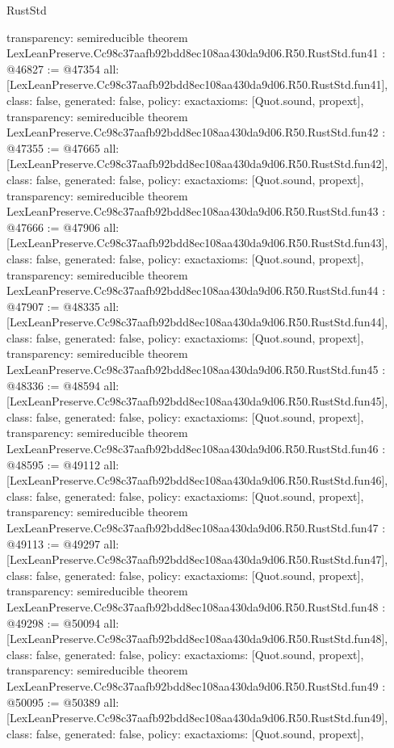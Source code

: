 \begin{lexlean}{RustStd}
\begin{coremodule}
{  transparency: semireducible
}
theorem LexLeanPreserve.Cc98c37aafb92bdd8ec108aa430da9d06.R50.RustStd.fun41 : @46827 := @47354 {
  all: [LexLeanPreserve.Cc98c37aafb92bdd8ec108aa430da9d06.R50.RustStd.fun41],
  class: false,
  generated: false,
  policy: exact{axioms: [Quot.sound, propext]},
  transparency: semireducible
}
theorem LexLeanPreserve.Cc98c37aafb92bdd8ec108aa430da9d06.R50.RustStd.fun42 : @47355 := @47665 {
  all: [LexLeanPreserve.Cc98c37aafb92bdd8ec108aa430da9d06.R50.RustStd.fun42],
  class: false,
  generated: false,
  policy: exact{axioms: [Quot.sound, propext]},
  transparency: semireducible
}
theorem LexLeanPreserve.Cc98c37aafb92bdd8ec108aa430da9d06.R50.RustStd.fun43 : @47666 := @47906 {
  all: [LexLeanPreserve.Cc98c37aafb92bdd8ec108aa430da9d06.R50.RustStd.fun43],
  class: false,
  generated: false,
  policy: exact{axioms: [Quot.sound, propext]},
  transparency: semireducible
}
theorem LexLeanPreserve.Cc98c37aafb92bdd8ec108aa430da9d06.R50.RustStd.fun44 : @47907 := @48335 {
  all: [LexLeanPreserve.Cc98c37aafb92bdd8ec108aa430da9d06.R50.RustStd.fun44],
  class: false,
  generated: false,
  policy: exact{axioms: [Quot.sound, propext]},
  transparency: semireducible
}
theorem LexLeanPreserve.Cc98c37aafb92bdd8ec108aa430da9d06.R50.RustStd.fun45 : @48336 := @48594 {
  all: [LexLeanPreserve.Cc98c37aafb92bdd8ec108aa430da9d06.R50.RustStd.fun45],
  class: false,
  generated: false,
  policy: exact{axioms: [Quot.sound, propext]},
  transparency: semireducible
}
theorem LexLeanPreserve.Cc98c37aafb92bdd8ec108aa430da9d06.R50.RustStd.fun46 : @48595 := @49112 {
  all: [LexLeanPreserve.Cc98c37aafb92bdd8ec108aa430da9d06.R50.RustStd.fun46],
  class: false,
  generated: false,
  policy: exact{axioms: [Quot.sound, propext]},
  transparency: semireducible
}
theorem LexLeanPreserve.Cc98c37aafb92bdd8ec108aa430da9d06.R50.RustStd.fun47 : @49113 := @49297 {
  all: [LexLeanPreserve.Cc98c37aafb92bdd8ec108aa430da9d06.R50.RustStd.fun47],
  class: false,
  generated: false,
  policy: exact{axioms: [Quot.sound, propext]},
  transparency: semireducible
}
theorem LexLeanPreserve.Cc98c37aafb92bdd8ec108aa430da9d06.R50.RustStd.fun48 : @49298 := @50094 {
  all: [LexLeanPreserve.Cc98c37aafb92bdd8ec108aa430da9d06.R50.RustStd.fun48],
  class: false,
  generated: false,
  policy: exact{axioms: [Quot.sound, propext]},
  transparency: semireducible
}
theorem LexLeanPreserve.Cc98c37aafb92bdd8ec108aa430da9d06.R50.RustStd.fun49 : @50095 := @50389 {
  all: [LexLeanPreserve.Cc98c37aafb92bdd8ec108aa430da9d06.R50.RustStd.fun49],
  class: false,
  generated: false,
  policy: exact{axioms: [Quot.sound, propext]},
}
\end{coremodule}
\end{lexlean}
